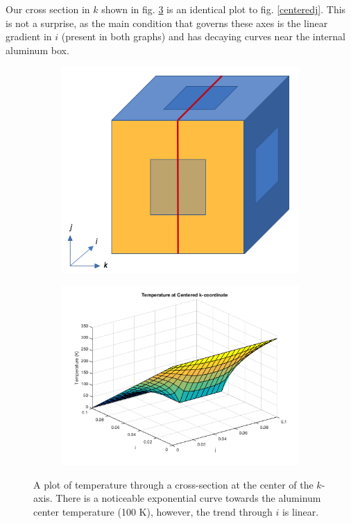 \documentclass[12pt]{article}
\begin{document}
Our cross section in $k$ shown in fig. \ref{centeredk} is an identical plot to fig. \ref{centeredj}.  This is not a surprise, as the main condition that governs these axes is the linear gradient in $i$ (present in both graphs) and has decaying curves near the internal aluminum box.

\begin{figure}[h!]
\begin{center}
\begin{subfigure}{0.3\textwidth}
\includegraphics[width=\linewidth]{../pics/centeredkpic.png}
\caption{\label{centeredkpic}}
\end{subfigure}
\begin{subfigure}{0.6\textwidth}
\includegraphics[width=\linewidth]{../pics/centeredk.png}
\caption{\label{centeredk}}
\end{subfigure}
\caption{A plot of temperature through a cross-section at the center of the $k$-axis.  There is a noticeable exponential curve towards the aluminum center temperature (100 K), however, the trend through $i$ is linear.}
\end{center}
\end{figure}
\end{document}
